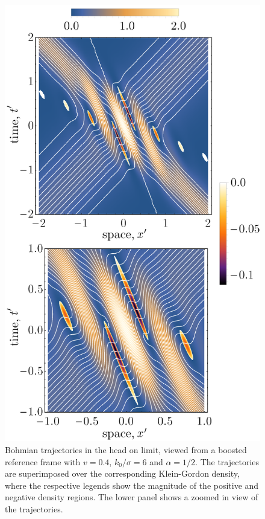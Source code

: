 \documentclass[
prx
,twocolumn
,nofootinbib
,floatfix
,superscriptaddress
]{revtex4-2}
\begin{document}
\begin{figure}[h]
    \centering
    \includegraphics[width=0.925\linewidth]{Fig5negative.png}
    \caption{Bohmian trajectories in the head on limit, viewed from a boosted reference frame with $v = 0.4$, $k_0/\sigma = 6$ and $\alpha = 1/2$. The trajectories are superimposed over the corresponding Klein-Gordon density, where the respective legends show the magnitude of the positive and negative density regions. The lower panel shows a zoomed in view of the trajectories. }
    \label{fig:negative}
\end{figure}
\end{document}
